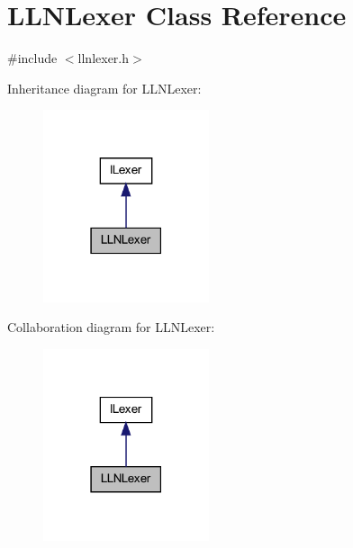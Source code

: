 \hypertarget{class_l_l_n_lexer}{
\section{LLNLexer Class Reference}
\label{class_l_l_n_lexer}
}


{\ttfamily \#include $<$llnlexer.h$>$}



Inheritance diagram for LLNLexer:\nopagebreak
\begin{figure}[H]
\begin{center}
\leavevmode
\includegraphics[width=138pt]{class_l_l_n_lexer__inherit__graph}
\end{center}
\end{figure}


Collaboration diagram for LLNLexer:\nopagebreak
\begin{figure}[H]
\begin{center}
\leavevmode
\includegraphics[width=138pt]{class_l_l_n_lexer__coll__graph}
\end{center}
\end{figure}
